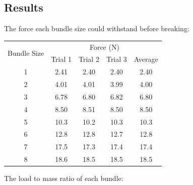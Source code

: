 \documentclass[a4paper,11pt]{article}
\begin{document}
\subsection{Results}

The force each bundle size could withstand before breaking:

\begin{center}
\begin{tabular}{|c|c|c|c|c|}
\hline
\multirow{2}{*}{Bundle Size} & \multicolumn{4}{c|}{Force (N)} \\
\cline{2-5}
& Trial 1 & Trial 2 & Trial 3 & Average \\
\hline
1 & 2.41 & 2.40 & 2.40 & 2.40 \\
2 & 4.01 & 4.01 & 3.99 & 4.00 \\
3 & 6.78 & 6.80 & 6.82 & 6.80 \\
4 & 8.50 & 8.51 & 8.50 & 8.50 \\
5 & 10.3 & 10.2 & 10.3 & 10.3 \\
6 & 12.8 & 12.8 & 12.7 & 12.8 \\
7 & 17.5 & 17.3 & 17.4 & 17.4 \\
8 & 18.6 & 18.5 & 18.5 & 18.5 \\
\hline
\end{tabular}
\end{center}

The load to mass ratio of each bundle:

\begin{center}
\end{center}
\end{document}
